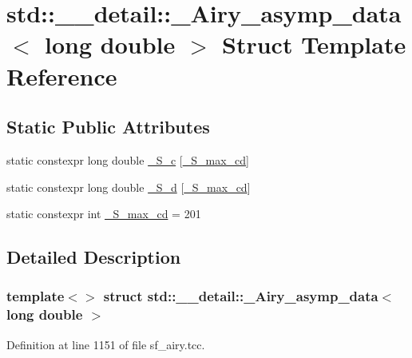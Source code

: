\hypertarget{structstd_1_1____detail_1_1__Airy__asymp__data_3_01long_01double_01_4}{}\section{std\+:\+:\+\_\+\+\_\+detail\+:\+:\+\_\+\+Airy\+\_\+asymp\+\_\+data$<$ long double $>$ Struct Template Reference}
\label{structstd_1_1____detail_1_1__Airy__asymp__data_3_01long_01double_01_4}
\subsection*{Static Public Attributes}
\begin{DoxyCompactItemize}
\item 
static constexpr long double \hyperlink{structstd_1_1____detail_1_1__Airy__asymp__data_3_01long_01double_01_4_a563bbe7d1ef612defb41aaedcc5657fe}{\+\_\+\+S\+\_\+c} \mbox{[}\hyperlink{structstd_1_1____detail_1_1__Airy__asymp__data_3_01long_01double_01_4_a6a21ac69ffc53d33ebc346981bc52b9a}{\+\_\+\+S\+\_\+max\+\_\+cd}\mbox{]}
\item 
static constexpr long double \hyperlink{structstd_1_1____detail_1_1__Airy__asymp__data_3_01long_01double_01_4_a3c49ca222e675f3def5077e46c7d6834}{\+\_\+\+S\+\_\+d} \mbox{[}\hyperlink{structstd_1_1____detail_1_1__Airy__asymp__data_3_01long_01double_01_4_a6a21ac69ffc53d33ebc346981bc52b9a}{\+\_\+\+S\+\_\+max\+\_\+cd}\mbox{]}
\item 
static constexpr int \hyperlink{structstd_1_1____detail_1_1__Airy__asymp__data_3_01long_01double_01_4_a6a21ac69ffc53d33ebc346981bc52b9a}{\+\_\+\+S\+\_\+max\+\_\+cd} = 201
\end{DoxyCompactItemize}


\subsection{Detailed Description}
\subsubsection*{template$<$$>$\newline
struct std\+::\+\_\+\+\_\+detail\+::\+\_\+\+Airy\+\_\+asymp\+\_\+data$<$ long double $>$}



Definition at line 1151 of file sf\+\_\+airy.\+tcc.



